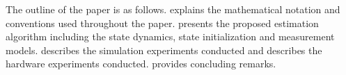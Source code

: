 
The outline of the paper is as follows.
 explains the mathematical notation and conventions used throughout the paper.
 presents the proposed estimation algorithm including the
state dynamics, state initialization and measurement models.
 describes the simulation experiments conducted and
 describes the hardware experiments conducted.
 provides concluding remarks.
